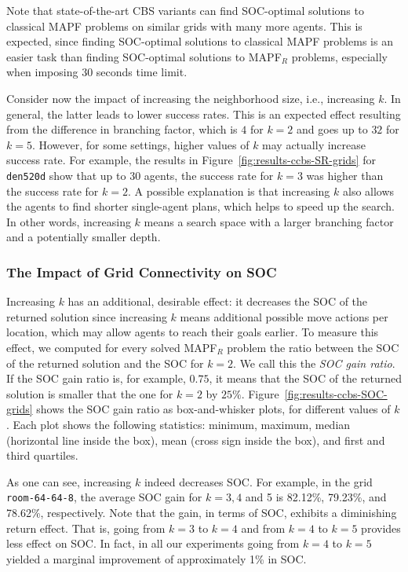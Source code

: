\documentclass[review]{elsarticle}
\newcommand\konstantin[1]{\nb{\textbf{Konstantin:}}{red}{#1}}
\newcommand\roni[1]{\nb{\textbf{Roni:}}{green}{#1}}
\newcommand{\cbs}{\ac{CBS}\xspace}
\newcommand{\mapfr}{\ac{MAPF}$_R$\xspace}
\newcommand{\mapf}{\ac{MAPF}\xspace}
\begin{document}
Note that state-of-the-art \cbs variants 
can find SOC-optimal solutions to classical \mapf problems on similar grids with many more agents. This is expected, since finding SOC-optimal solutions to classical \mapf problems is an easier task than finding SOC-optimal solutions to \mapfr problems, especially when imposing 30 seconds time limit. 

Consider now the impact of increasing the neighborhood size, i.e., increasing $k$. 
In general, the latter leads to lower success rates. This is an expected effect resulting from the difference in branching factor, which is $4$ for $k=2$ and goes up to $32$ for $k=5$. However, for some settings, higher values of $k$ may actually increase success rate. 
For example, the results in Figure~\ref{fig:results-ccbs-SR-grids} for \texttt{den520d} show that up to 30 agents, the success rate for $k=3$ was higher than the success rate for $k=2$.  
A possible explanation is that increasing $k$ also allows the agents to find shorter single-agent plans, which helps to speed up the search. In other words, increasing $k$ means a search space with a larger branching factor and a potentially smaller depth. %


\subsubsection{The Impact of Grid Connectivity on SOC}
Increasing $k$ has an additional, desirable effect: it decreases the SOC of the returned solution since increasing $k$ means additional possible move actions per location, which may allow agents to reach their goals earlier. To measure this effect, we computed for every solved \mapfr problem the ratio between the SOC of the returned solution and the SOC for $k=2$. 
We call this the \emph{SOC gain ratio}. 
If the SOC gain ratio is, for example, $0.75$, it means that the SOC of the returned solution is smaller that the one for $k=2$ by $25\%$. 
Figure~\ref{fig:results-ccbs-SOC-grids} shows the SOC gain ratio as box-and-whisker plots, for different values of $k$. Each plot shows the following statistics: minimum, maximum, median (horizontal line inside the box), mean (cross sign inside the box), and first and third quartiles. 

As one can see, increasing $k$ indeed decreases SOC. 
For example, in the grid \texttt{room-64-64-8}, the average SOC gain for $k=3, 4$ and 5 is 82.12\%, 79.23\%, and 78.62\%, respectively.
Note that the gain, in terms of SOC, exhibits a diminishing return effect. That is, going from $k=3$ to $k=4$ and from $k=4$ to $k=5$ provides less effect on SOC. In fact, in all our experiments going from $k=4$ to $k=5$ yielded a marginal improvement of approximately 1\% in SOC. %
\end{document}

